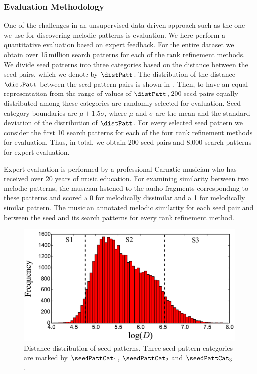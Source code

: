 

\subsubsection{Evaluation Methodology}
\label{sec:evaluationmethodology}

One of the challenges in an unsupervised data-driven approach such as the one we use for discovering melodic patterns is evaluation. We here perform a quantitative evaluation based on expert feedback. For the entire dataset we obtain over 15\,million search patterns for each of the rank refinement methods. We divide seed patterns into three categories based on the distance between the seed pairs, which we denote by $\distPatt$. The distribution of the distance $\distPatt$ between the seed pattern pairs is shown in~. Then, to have an equal representation from the range of values of $\distPatt$, 200 seed pairs equally distributed among these categories are randomly selected for evaluation. Seed category boundaries are $\mu \pm 1.5\sigma$, where $\mu$ and $\sigma$ are the mean and the standard deviation of the distribution of $\distPatt$. For every selected seed pattern we consider the first 10 search patterns for each of the four rank refinement methods for evaluation. Thus, in total, we obtain 200 seed pairs and 8,000 search patterns for expert evaluation.

Expert evaluation is performed by a professional Carnatic musician who has received over 20 years of music education. For examining similarity between two melodic patterns, the musician listened to the audio fragments corresponding to these patterns and scored a 0 for melodically dissimilar and a 1 for melodically similar pattern. The musician annotated melodic similarity for each seed pair and between the seed and its search patterns for every rank refinement method.


\begin{figure}
	\begin{center}
		\includegraphics[width=\figSizeEightyFive]{ch06_patterns/figures/discovery/SeedDistribution.pdf}
	\end{center}
	\caption{Distance distribution of seed patterns. Three seed pattern categories are marked by $\seedPattCat_1$, $\seedPattCat_2$ and $\seedPattCat_3$.}
	\label{fig:SeedPatternsDistanceDistribution}
\end{figure}


